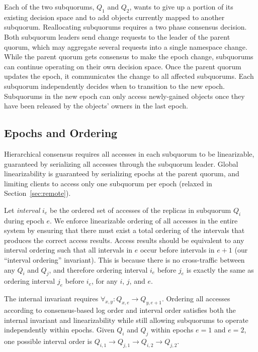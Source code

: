 \documentclass[sigconf]{acmart}
\begin{document}
Each of the two subquorums, $Q_1$ and $Q_2$, wants to give up a portion of its
existing decision space and to add objects currently mapped to another subquorum.
Reallocating subquorums requires a two phase consensus decision.
Both subquorum leaders send change requests to the leader of the parent quorum, which may
aggregate several requests into a single namespace change.
While the parent quorum gets consensus to make the epoch change, subquorums can continue
operating on their own decision space.
Once the parent quorum updates the epoch, it communicates the change to all affected
subquorums.
Each subquorum independently decides when to transition to the new epoch.
Subquorums in the new epoch can only access newly-gained objects once they have been
released by the objects' owners in the last epoch.

\subsection{Epochs and Ordering}

Hierarchical consensus requires all accesses in each subquorum to be linearizable,
guaranteed by serializing all accesses through the subquorum leader.
Global linearizability is guaranteed by serializing epochs at the parent
quorum, and limiting clients to access only one subquorum per epoch (relaxed
in Section~\ref{sec:remote}).

Let \emph{interval} $i_e$ be the ordered set of accesses of the replicas in subquorum
$Q_i$ during epoch $e$.
We enforce linearizable ordering of all accesses in the entire system by
ensuring that there must exist a total ordering of the intervals that produces the correct
access results.
Access results should be equivalent to any interval ordering
such that all intervals in $e$ occur before intervals in $e+1$ (our ``interval
ordering'' invariant).
This is because there is no cross-traffic between any $Q_i$ and $Q_j$, and therefore
ordering interval $i_e$ before $j_e$ is exactly the same as ordering interval $j_e$
before $i_e$, for any $i$, $j$, and $e$.

The internal invariant requires $\forall_{x,y} : Q_{x,e} \rightarrow Q_{y,e+1}$.
Ordering all accesses according to consensus-based log order and interval order satisfies both the
internal invariant and linearizability  while still allowing subquorums to operate
independently within epochs.
Given $Q_i$ and $Q_j$ within epochs $e=1$ and $e=2$, one possible interval order is
$Q_{i,1} \rightarrow Q_{j,1} \rightarrow Q_{i,2} \rightarrow Q_{j,2}$.
\end{document}
